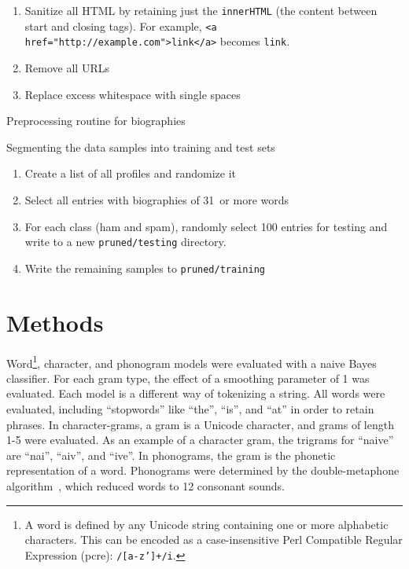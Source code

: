 \documentclass[10pt]{article}
\def \minWordLength {31\ }
\begin{document}
\begin{algorithm}[b]
  \begin{enumerate}
  \item Sanitize all HTML by retaining just the \texttt{innerHTML} (the
    content between start and closing tags). For example, \texttt{<a
      href="http://example.com">link</a>} becomes \texttt{link}.
  \item Remove all URLs
  \item Replace excess whitespace with single spaces
  \end{enumerate}
  \caption{Preprocessing routine for biographies}
  \label{algo:preprocess}
\end{algorithm}

\begin{algorithm}[t]
  \caption{Segmenting the data samples into training and test sets}
  \label{algo:segment}
  \begin{enumerate}
  \item Create a list of all profiles and randomize it
  \item Select all entries with biographies of \minWordLength or more words
  \item For each class (ham and spam), randomly select 100 entries for testing
    and write to a new \texttt{pruned/testing} directory.
  \item Write the remaining samples to \texttt{pruned/training}
  \end{enumerate}
\end{algorithm}


\section{Methods}


Word\footnote{%
  A word is defined by any Unicode string containing one or more alphabetic
  characters. This can be encoded as a case-insensitive Perl Compatible
  Regular Expression ({\sc pcre}): \texttt{/[a-z']+/i}.}, character, and
phonogram models were evaluated with a naive Bayes classifier. For each gram
type, the effect of a smoothing parameter of 1 was evaluated. Each model is a
different way of tokenizing a string. All words were evaluated, including
``stopwords'' like ``the'', ``is'', and ``at'' in order to retain phrases. In
character-grams, a gram is a Unicode character, and grams of length 1-5 were
evaluated. As an example of a character gram, the trigrams for ``naive'' are
``nai'', ``aiv'', and ``ive''. In phonograms, the gram is the phonetic
representation of a word. Phonograms were determined by the double-metaphone
algorithm~\cite{double-metaphone}, which reduced words to 12 consonant sounds.
\end{document}
